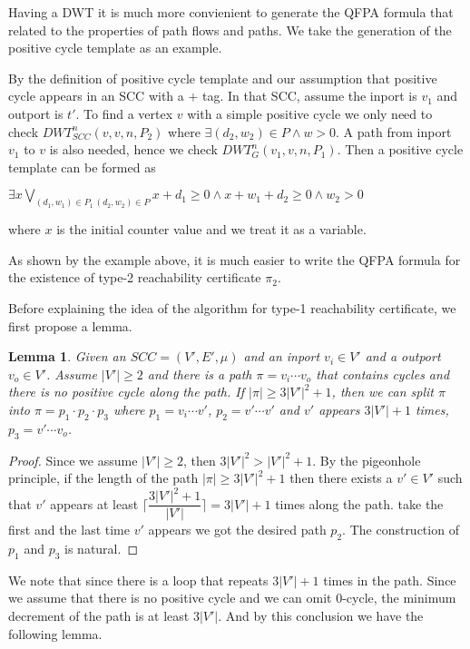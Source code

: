 \documentclass[12pt]{article}
\newtheorem{lemma}{Lemma}
\newtheorem{proof}{\textit{Proof}}
\begin{document}
\begin{itemize}
Having a DWT it is much more convienient to generate the QFPA formula that related to the properties of path flows and paths. We take the generation of the positive cycle template as an example. 

By the definition of positive cycle template and our assumption that positive cycle appears in an SCC with a $+$ tag. In that SCC, assume the inport is $v_1$ and outport is $t'$. To find a vertex $v$ with a simple positive cycle we only need to check $DWT_{SCC}^n(v,v,n,P_2)$ where $\exists (d_2,w_2)\in P \wedge w > 0 $. A path from inport $v_1$ to $v$ is also needed, hence we check $DWT_G^n(v_1, v, n, P_1)$. Then a positive cycle template can be formed as 
\begin{center}
$\exists x\bigvee_{(d_1,w_1)\in P_1\, (d_2,w_2)\in P} x+d_1 \ge 0 \wedge x+w_1+d_2 \ge 0 \wedge w_2>0$
\end{center}

where $x$ is the initial counter value and we treat it as a variable.

As shown by the example above, it is much easier to write the QFPA formula for the existence of type-2 reachability certificate $\pi_2$.

Before explaining the idea of the algorithm for type-1 reachability certificate, we first propose a lemma.
\begin{lemma}
Given an $SCC = (V', E', \mu)$ and an inport $v_i\in V'$ and a outport $v_o \in V'$. Assume $|V'| \ge 2$ and there is a path $\pi = v_i\cdots v_o$ that contains cycles and there is no positive cycle along the path. If $|\pi| \ge 3|V'|^2 + 1$, then we can split $\pi$ into $\pi = p_1\cdot p_2 \cdot p_3$ where $p_1 = v_i\cdots v'$, $p_2 = v'\cdots v'$ and $v'$ appears $3|V'|+1$ times, $p_3 = v'\cdots v_o$.

\end{lemma}


\begin{proof}
Since we assume $|V'| \ge 2$, then $3|V'|^2 > |V'|^2+1$. By the pigeonhole principle, if the length of the path $|\pi| 
\ge 3|V'|^2 + 1 $ then there exists a $v'\in V'$ such that $v'$ appears at least $\lceil\dfrac{3|V'|^2 + 1}{|V'|}\rceil = 3|V'| + 1 $ times along the path. take the first and the last time $v'$ appears we got the desired path $p_2$. The construction of $p_1$ and $p_3$ is natural.
\end{proof}


We note that since there is a loop that repeats $3|V'| + 1$ times in the path. Since we assume that there is no positive cycle and we can omit 0-cycle, the minimum decrement of the path is at least $3|V'|$. And by this conclusion we have the following lemma.


\end{itemize}
\end{document}
